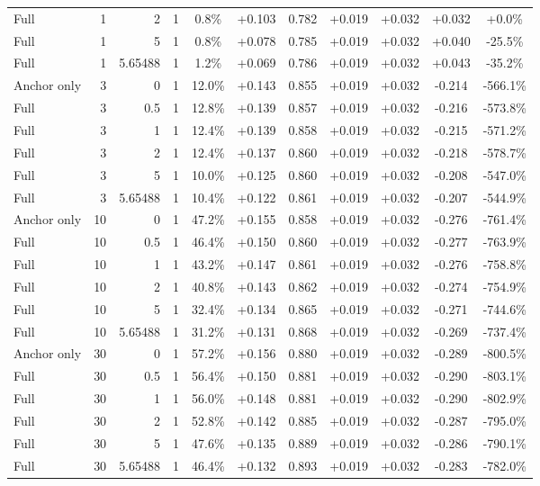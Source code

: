 \begin{table}[htbp]
\begin{tabular}{lrrrccccccc}
Full & 1 & 2 & 1 & 0.8\% & +0.103 & 0.782 & +0.019 & +0.032 & +0.032 & +0.0\% \\
Full & 1 & 5 & 1 & 0.8\% & +0.078 & 0.785 & +0.019 & +0.032 & +0.040 & -25.5\% \\
Full & 1 & 5.65488 & 1 & 1.2\% & +0.069 & 0.786 & +0.019 & +0.032 & +0.043 & -35.2\% \\
Anchor only & 3 & 0 & 1 & 12.0\% & +0.143 & 0.855 & +0.019 & +0.032 & -0.214 & -566.1\% \\
Full & 3 & 0.5 & 1 & 12.8\% & +0.139 & 0.857 & +0.019 & +0.032 & -0.216 & -573.8\% \\
Full & 3 & 1 & 1 & 12.4\% & +0.139 & 0.858 & +0.019 & +0.032 & -0.215 & -571.2\% \\
Full & 3 & 2 & 1 & 12.4\% & +0.137 & 0.860 & +0.019 & +0.032 & -0.218 & -578.7\% \\
Full & 3 & 5 & 1 & 10.0\% & +0.125 & 0.860 & +0.019 & +0.032 & -0.208 & -547.0\% \\
Full & 3 & 5.65488 & 1 & 10.4\% & +0.122 & 0.861 & +0.019 & +0.032 & -0.207 & -544.9\% \\
Anchor only & 10 & 0 & 1 & 47.2\% & +0.155 & 0.858 & +0.019 & +0.032 & -0.276 & -761.4\% \\
Full & 10 & 0.5 & 1 & 46.4\% & +0.150 & 0.860 & +0.019 & +0.032 & -0.277 & -763.9\% \\
Full & 10 & 1 & 1 & 43.2\% & +0.147 & 0.861 & +0.019 & +0.032 & -0.276 & -758.8\% \\
Full & 10 & 2 & 1 & 40.8\% & +0.143 & 0.862 & +0.019 & +0.032 & -0.274 & -754.9\% \\
Full & 10 & 5 & 1 & 32.4\% & +0.134 & 0.865 & +0.019 & +0.032 & -0.271 & -744.6\% \\
Full & 10 & 5.65488 & 1 & 31.2\% & +0.131 & 0.868 & +0.019 & +0.032 & -0.269 & -737.4\% \\
Anchor only & 30 & 0 & 1 & 57.2\% & +0.156 & 0.880 & +0.019 & +0.032 & -0.289 & -800.5\% \\
Full & 30 & 0.5 & 1 & 56.4\% & +0.150 & 0.881 & +0.019 & +0.032 & -0.290 & -803.1\% \\
Full & 30 & 1 & 1 & 56.0\% & +0.148 & 0.881 & +0.019 & +0.032 & -0.290 & -802.9\% \\
Full & 30 & 2 & 1 & 52.8\% & +0.142 & 0.885 & +0.019 & +0.032 & -0.287 & -795.0\% \\
Full & 30 & 5 & 1 & 47.6\% & +0.135 & 0.889 & +0.019 & +0.032 & -0.286 & -790.1\% \\
Full & 30 & 5.65488 & 1 & 46.4\% & +0.132 & 0.893 & +0.019 & +0.032 & -0.283 & -782.0\% \\

\end{tabular}
\end{table}
